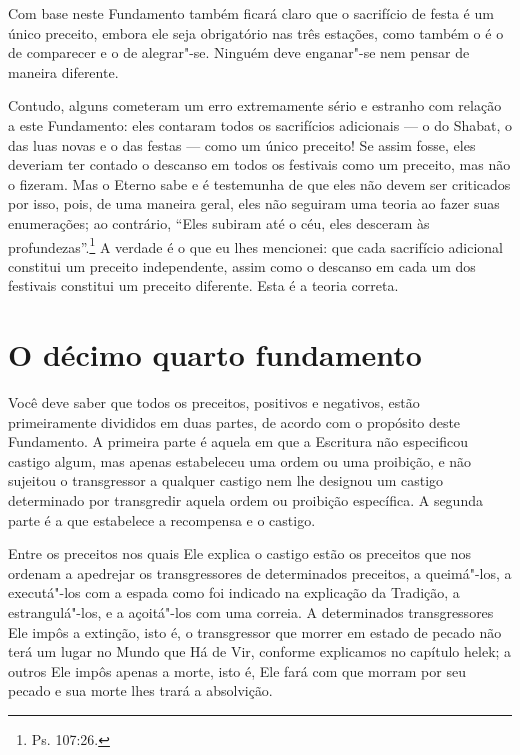 Com base neste Fundamento também ficará claro que o sacrifício de festa
é um único preceito, embora ele seja obrigatório nas três estações,
como também o é o de comparecer e o de alegrar"-se. Ninguém deve
enganar"-se nem pensar de maneira diferente.

Contudo, alguns cometeram um erro extremamente sério e estranho com
relação a este Fundamento: eles contaram todos os sacrifícios adicionais
--- o do Shabat, o das luas novas e o das festas --- como um único
preceito! Se assim fosse, eles deveriam ter contado o descanso em todos
os festivais como um preceito, mas não o fizeram. Mas o Eterno sabe e é
testemunha de que eles não devem ser criticados por isso, pois, de uma
maneira geral, eles não seguiram uma teoria ao fazer suas enumerações;
ao contrário, ``Eles subiram até o céu, eles desceram às profundezas''.\footnote{Ps. 107:26.} A verdade é o que eu lhes mencionei: que cada sacrifício
adicional constitui um preceito independente, assim como o descanso em
cada um dos festivais constitui um preceito diferente. Esta é a teoria
correta.

\chapter*{O décimo quarto fundamento}

Você deve saber que todos os preceitos, positivos e negativos, estão
primeiramente divididos em duas partes, de acordo com o propósito deste
Fundamento. A primeira parte é aquela em que a Escritura não
especificou castigo algum, mas apenas estabeleceu uma ordem ou uma
proibição, e não sujeitou o transgressor a qualquer castigo nem lhe
designou um castigo determinado por transgredir aquela ordem ou
proibição específica. A segunda parte é a que estabelece a recompensa e
o castigo.

Entre os preceitos nos quais Ele explica o castigo estão os preceitos
que nos ordenam a apedrejar os transgressores de determinados preceitos,
a queimá"-los, a executá"-los com a espada como foi indicado na explicação
da Tradição, a estrangulá"-los, e a açoitá"-los com uma correia. A
determinados transgressores Ele impôs a extinção, isto é, o
transgressor que morrer em estado de pecado não terá um lugar no Mundo
que Há de Vir, conforme explicamos no capítulo helek\starr; a outros Ele
impôs apenas a morte, isto é, Ele fará com que morram por seu pecado e
sua morte lhes trará a absolvição.

